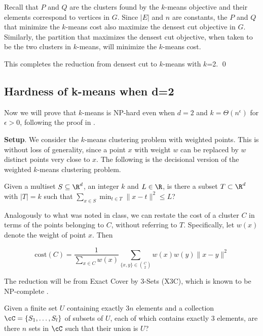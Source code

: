 Recall that $P$ and $Q$ are the clusters found by the $k$-means objective and their elements correspond to vertices in $G$. Since $|E|$ and $n$ are constants, the $P$ and $Q$ that minimize the $k$-means cost also maximize the densest cut objective in $G$. Similarly, the partition that maximizes the densest cut objective, when taken to be the two clusters in $k$-means, will minimize the $k$-means cost.

This completes the reduction from densest cut to $k$-means with $k$=2.
\qed

\subsection{Hardness of k-means when d=2}

Now we will prove that $k$-means is NP-hard even when $d=2$ and $k=\Theta(n^\epsilon)$ for $\epsilon>0$, following the proof in \cite{vattani}.

\textbf{Setup}. We consider the $k$-means clustering problem with weighted points. This is without loss of generality, since a point $x$ with weight $w$ can be replaced by $w$ distinct points very close to $x$. The following is the decisional version of the weighted $k$-means clustering problem.

\begin{definition}
    Given a multiset $S\subseteq \R^d$, an integer $k$ and $L\in\R$, is there a subset $T\subset\R^d$ with $|T|=k$ such that $\sum_{x\in S}\min_{t\in T}\|x-t\|^2\le L$?
\end{definition}

Analogously to what was noted in class, we can restate the cost of a cluster $C$ in terms of the points belonging to $C$, without referring to $T$. Specifically, let $w(x)$ denote the weight of point $x$. Then

$$\text{cost}(C)=\frac{1}{\sum_{x\in C} w(x)}\sum_{\{x,y\}\in\binom{C}{2}}w(x)w(y)\|x-y\|^2$$

The reduction will be from Exact Cover by 3-Sets (X3C), which is known to be NP-complete \cite{garey1979computers}.

\begin{definition}
    Given a finite set $U$ containing exactly $3n$ elements and a collection $\cC=\{S_1,\dots,S_l\}$ of subsets of $U$, each of which contains exactly 3 elements, are there $n$ sets in $\cC$ such that their union is $U$?
\end{definition}

